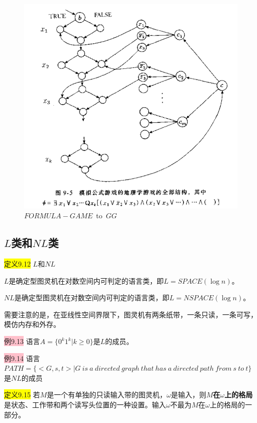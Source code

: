 \documentclass[a4paper]{article}
\begin{document}
		\begin{figure}[htb]
			\centering
			\includegraphics[scale=0.8]{./figure/9.11.png}
			\caption{$FORMULA-GAME$~to~$GG$}
			\label{F0911}
    	\end{figure} 

\subsection{$L$类和$NL$类}

	\colorbox{yellow}{定义9.12} $L$和$NL$
	
		\qquad $L$是确定型图灵机在对数空间内可判定的语言类，即$L=SPACE(\log{n})$。
		
		\qquad $NL$是确定型图灵机在对数空间内可判定的语言类，即$L=NSPACE(\log{n})$。
		
	需要注意的是，在亚线性空间界限下，图灵机有两条纸带，一条只读，一条可写，模仿内存和外存。

	\colorbox{pink}{例9.13} 语言$A=\{0^k1^k|k\geq 0\}$是$L$的成员。

	\colorbox{pink}{例9.14} 语言$PATH=\{<G,s,t>|G~is~a~directed~graph~that~has~a~directed~path~from~s~to~t\}$是$NL$的成员

	\colorbox{yellow}{定义9.15} 若$M$是一个有单独的只读输入带的图灵机，$\omega$是输入，则\textbf{$M$在$\omega$上的格局}是状态、工作带和两个读写头位置的一种设置。输入$\omega$不最为$M$在$\omega$上的格局的一部分。
\end{document}
